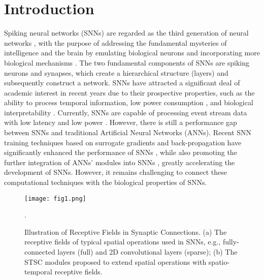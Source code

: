 \documentclass[letterpaper]{article} \usepackage[submission]{aaai23}  \usepackage{times}  \usepackage{helvet}  \usepackage{courier}  \usepackage[hyphens]{url}  \usepackage{graphicx} \urlstyle{rm} \def\UrlFont{\rm}  \usepackage{natbib}  \usepackage{caption} \frenchspacing  \setlength{\pdfpagewidth}{8.5in} \setlength{\pdfpageheight}{11in} \usepackage{algorithm}
\begin{document}
\section{Introduction}
Spiking neural networks (SNNs) are regarded as the third generation of neural networks \cite{maass_networks_1997}, with the purpose of addressing the fundamental mysteries of intelligence and the brain by emulating biological neurons and incorporating more biological mechanisms \cite{roy_towards_2019}. The two fundamental components of SNNs are spiking neurons and synapses, which create a hierarchical structure (layers) and subsequently construct a network. SNNs have attracted a significant deal of academic interest in recent years due to their prospective properties, such as the ability to process temporal information, low power consumption \cite{roy_towards_2019}, and biological interpretability \cite{gerstner_neuronal_2014}.
Currently, SNNs are capable of processing event stream data with low latency and low power \cite{pei_towards_2019,gallego_event-based_2020}. However, there is still a performance gap between SNNs and traditional Artificial Neural Networks (ANNs). Recent SNN training techniques based on surrogate gradients and back-propagation have significantly enhanced the performance of SNNs \cite{wu_spatio-temporal_2018,fang_incorporating_2021}, while also promoting the further integration of ANNs' modules into SNNs
\cite{zheng_going_2020,hu_spiking_2021,yao_temporal-wise_2021},
greatly accelerating the development of SNNs. 
However, it remains challenging to connect these computational techniques with the biological properties of SNNs.

\begin{figure}[t]
\centering
\texttt{[image: fig1.png]} 
\caption{Illustration of Receptive Fields in Synaptic Connections. (a) The receptive fields of typical spatial operations used in SNNs, e.g., fully-connected layers (full) and 2D convolutional layers (sparse); (b) The STSC modules proposed to extend spatial operations with spatio-temporal receptive fields. 
}.
\label{fig1}
\end{figure}
\end{document}
